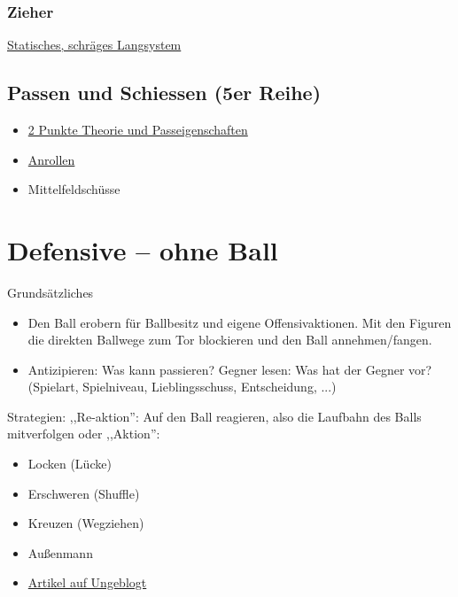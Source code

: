 \subsubsection{Zieher}
\href{http://ungeblogtkickern.blogspot.de/2015/09/system-zieher.html}{
    Statisches, schräges Langsystem}


\subsection{Passen und Schiessen (5er Reihe)}
\label{taktik:offensive:passen}

\begin{itemize}
    \item \href{http://ungeblogtkickern.blogspot.de/2015/11/passspiel-1-passeigenschaften.html}{2 Punkte Theorie und Passeigenschaften}
    \item \href{http://ungeblogtkickern.blogspot.de/2015/11/passspiel-2-setup.html}{Anrollen}
    \item Mittelfeldschüsse 
\end{itemize}


\section{Defensive -- ohne Ball}
\label{taktik:defensive}

Grundsätzliches
\begin{itemize}
    \item Den Ball erobern für Ballbesitz und eigene Offensivaktionen. Mit den Figuren die direkten Ballwege zum Tor blockieren und den Ball annehmen/fangen. 
    \item Antizipieren: Was kann passieren? Gegner lesen: Was hat der Gegner vor? (Spielart, Spielniveau, Lieblingsschuss, Entscheidung, ...)
\end{itemize}

Strategien:
,,Re-aktion'': Auf den Ball reagieren, also die Laufbahn des Balls mitverfolgen oder ,,Aktion'':
\begin{itemize}
    \item Locken (Lücke)
    \item Erschweren (Shuffle)
    \item Kreuzen (Wegziehen)
    \item Außenmann 
    \item \href{http://ungeblogtkickern.blogspot.de/2015/06/defensivbewegungen-im-verteidigerbereich.html}{Artikel auf Ungeblogt}
\end{itemize}


